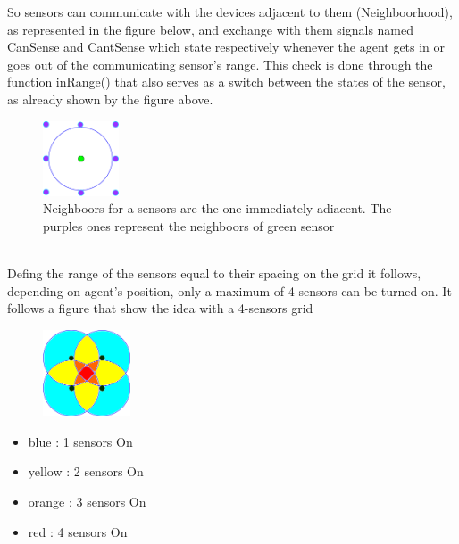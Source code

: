 \documentclass[twocolumn]{article}
\begin{document}
    So sensors can communicate with the devices adjacent to them (Neighboorhood), as represented in the figure below, and exchange with them signals named CanSense and CantSense
    which state respectively whenever the agent gets in or goes out of the communicating sensor's range. This check is done through the 
    function inRange() that also serves as a switch between the states of the sensor, as already shown by the figure above.
    \\
    \begin{figure}[h!]
        \centering
        \includegraphics[width=0.2\textwidth]{Immagini/2sensor.png}
        \caption{Neighboors for a sensors are the one immediately adiacent. The purples ones represent the neighboors of green sensor}
        \label{fig:galaxy}
    \end{figure}
    \\
    Defing the range of the sensors equal to their spacing on the grid it follows, depending on agent's position, only a maximum of 4 sensors can be turned on. 
    It follows a figure that show the idea with a 4-sensors grid
    \begin{figure}[h!]
        \centering
        \includegraphics[width=0.23\textwidth]{Immagini/4sensor.png}
        \caption{}
        \label{fig:galaxy}
    \end{figure}
    \begin{itemize}
        \item blue : 1 sensors On 
        \item yellow : 2 sensors On 
        \item orange : 3 sensors On 
        \item red : 4 sensors On 
        \end{itemize}
\end{document}
